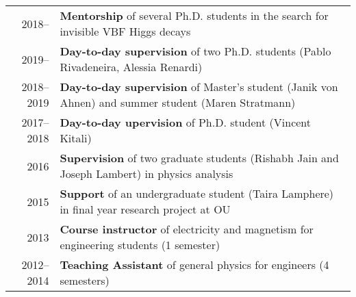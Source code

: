 \documentclass[a4paper,10pt]{article}
\begin{document}
\begin{tabular}{rp{15.5cm}}
\textsc{2018--\phantom{0000}} & {\bf Mentorship} of several Ph.D. students in the search for invisible VBF Higgs decays \\
\textsc{2019--\phantom{0000}} & {\bf Day-to-day supervision} of two Ph.D. students (Pablo Rivadeneira, Alessia Renardi) \\
\textsc{2018--2019}           & {\bf Day-to-day supervision} of Master's student (Janik von Ahnen) and summer student (Maren Stratmann)   \\
\textsc{2017--2018}           & {\bf Day-to-day upervision} of Ph.D. student (Vincent Kitali)   \\
\textsc{2016}                 & {\bf Supervision} of two graduate students (Rishabh Jain and Joseph Lambert) in physics analysis  \\
\textsc{2015}                 & {\bf Support} of an undergraduate student (Taira Lamphere) in final year research project at OU \\
\textsc{2013}          & {\bf Course instructor} of electricity and magnetism for engineering students (1 semester)\\
\textsc{2012--2014}		      & {\bf Teaching Assistant} of general physics for engineers (4 semesters)\\
\end{tabular}

\vspace{3mm}
\end{document}
